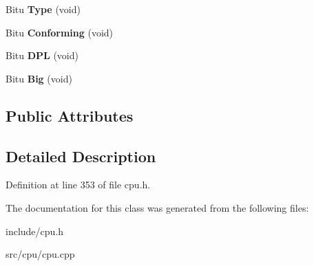 \begin{DoxyCompactItemize}
\item 
\hypertarget{classDescriptor_a118da781f7c7adaaa11621aad390ffc6}{Bitu {\bfseries Type} (void)}\label{classDescriptor_a118da781f7c7adaaa11621aad390ffc6}

\item 
\hypertarget{classDescriptor_a4ec26ddb8e89cd25b91e8a85d4670417}{Bitu {\bfseries Conforming} (void)}\label{classDescriptor_a4ec26ddb8e89cd25b91e8a85d4670417}

\item 
\hypertarget{classDescriptor_a4c290cdebb3024f82a5b3e2653a37c6c}{Bitu {\bfseries D\-P\-L} (void)}\label{classDescriptor_a4c290cdebb3024f82a5b3e2653a37c6c}

\item 
\hypertarget{classDescriptor_a12f3427c9ac3832f2c6f7df1d0959966}{Bitu {\bfseries Big} (void)}\label{classDescriptor_a12f3427c9ac3832f2c6f7df1d0959966}

\end{DoxyCompactItemize}
\subsection*{Public Attributes}


\subsection{Detailed Description}


Definition at line 353 of file cpu.\-h.



The documentation for this class was generated from the following files\-:\begin{DoxyCompactItemize}
\item 
include/cpu.\-h\item 
src/cpu/cpu.\-cpp\end{DoxyCompactItemize}
